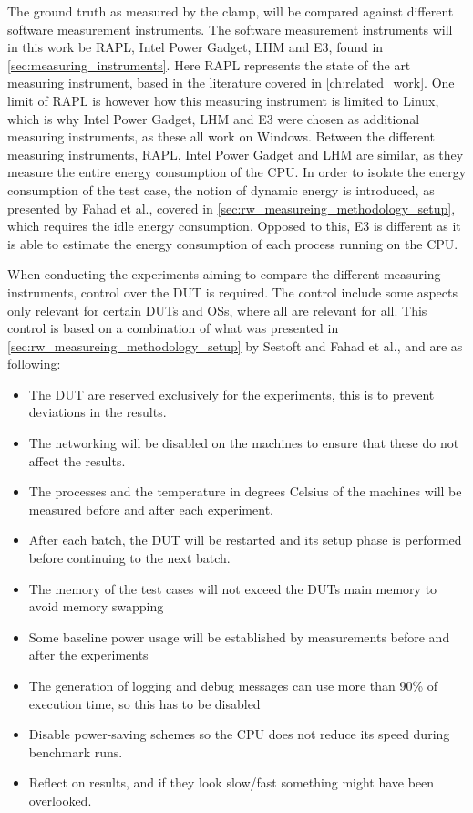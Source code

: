 The ground truth as measured by the clamp, will be compared against different software measurement instruments. The software measurement instruments will in this work be RAPL, Intel Power Gadget, LHM and E3, found in \cref{sec:measuring_instruments}. Here RAPL represents the state of the art measuring instrument, based in the literature covered in \cref{ch:related_work}. One limit of RAPL is however how this measuring instrument is limited to Linux, which is why Intel Power Gadget, LHM and E3 were chosen as additional measuring instruments, as these all work on Windows. Between the different measuring instruments, RAPL, Intel Power Gadget and LHM are similar, as they measure the entire energy consumption of the CPU. In order to isolate the energy consumption of the test case, the notion of dynamic energy is introduced, as presented by Fahad et al.\cite{fahad2019comparative}, covered in \cref{sec:rw_measureing_methodology_setup}, which requires the idle energy consumption. Opposed to this, E3 is different as it is able to estimate the energy consumption of each process running on the CPU.\newline

When conducting the experiments aiming to compare the different measuring instruments, control over the DUT is required. The control include some aspects only relevant for certain DUTs and OSs, where all are relevant for all. This control is based on a combination of what was presented in \cref{sec:rw_measureing_methodology_setup} by Sestoft\cite[]{sestoft2013microbenchmarks} and Fahad et al.\cite[]{fahad2019comparative}, and are as following:

\begin{itemize}
    \item The DUT are reserved exclusively for the experiments, this is to prevent deviations in the results.
    \item The networking will be disabled on the machines to ensure that these do not affect the results.
    \item The processes and the temperature in degrees Celsius of the machines will be measured before and after each experiment.
    \item After each batch, the DUT will be restarted and its setup phase is performed before continuing to the next batch.
    \item The memory of the test cases will not exceed the DUTs main memory to avoid memory swapping
    \item Some baseline power usage will be established by measurements before and after the experiments
    \item The generation of logging and debug messages can use more than 90\% of execution time, so this has to be disabled
    \item Disable power-saving schemes so the CPU does not reduce its speed during benchmark runs.
    \item Reflect on results, and if they look slow/fast something might have been overlooked.
\end{itemize}

